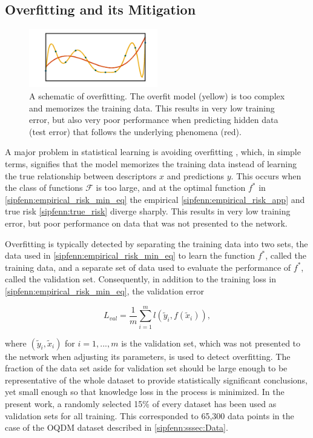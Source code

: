\subsection{Overfitting and its Mitigation}
\label{sipfenn:ssec:overfitting}

\begin{figure}[h]
    \centering
    \includegraphics[width=0.5\textwidth]{sipfenn/overfitting.png}
    \caption{A schematic of overfitting. The overfit model (yellow) is too complex and memorizes the training data. This results in very low training error, but also very poor performance when predicting hidden data (test error) that follows the underlying phenomena (red).}
    \label{sipfenn:fig:overfitting}
\end{figure}

A major problem in statistical learning is avoiding overfitting \cite{hastie2009elements}, which, in simple terms, signifies that the model memorizes the training data instead of learning the true  relationship between descriptors $x$ and predictions $y$. This occurs when the class of functions $\mathcal{F}$ is too large, and at the optimal function $f^*$ in \eqref{sipfenn:empirical_risk_min_eq} the empirical \eqref{sipfenn:empirical_risk_app} and true risk \eqref{sipfenn:true_risk} diverge sharply. This results in very low training error, but poor performance on data that was not presented to the network.

Overfitting is typically detected by separating the training data into two sets, the data used in \eqref{sipfenn:empirical_risk_min_eq} to learn the function $f^*$, called the training data, and a separate set of data used to evaluate the performance of $f^*$, called the validation set. Consequently, in addition to the training loss in \eqref{sipfenn:empirical_risk_min_eq}, the validation error

\begin{equation}\label{sipfenn:validation_loss}
    L_{val} = \frac{1}{m}\displaystyle\sum_{i=1}^m l(\tilde{y}_i, f(\tilde{x}_i)),
\end{equation}

where $(\tilde{y}_i,\tilde{x}_i)$ for $i=1,...,m$ is the validation set, which was not presented to the network when adjusting its parameters, is used to detect overfitting. 
The fraction of the data set aside for validation set should be large enough to be representative of the whole dataset to provide statistically significant conclusions, yet small enough so that knowledge loss in the process is minimized. In the present work, a randomly selected 15\% of every dataset has been used as validation sets for all training. This corresponded to 65,300 data points in the case of the OQDM dataset described in \ref{sipfenn:sssec:Data}.

